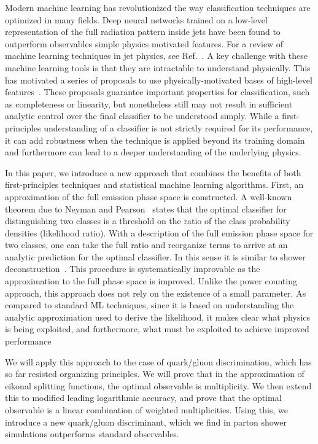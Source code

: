 \documentclass[letterpaper,11pt]{article}
\DeclareRobustCommand{\Ref}[1]{Ref.~\cite{#1}}
\begin{document}
Modern machine learning has revolutionized the way classification techniques are optimized in many fields.
%
Deep neural networks trained on a low-level representation of the full radiation pattern inside jets have been found to outperform observables simple physics motivated features.
%
For a review of machine learning techniques in jet physics, see \Ref{Larkoski:2017jix}.
%
A key challenge with these machine learning tools is that they are intractable to understand physically.
%
This has motivated a series of proposals to use physically-motivated bases of high-level features~\cite{Datta:2017rhs,Datta:2017lxt,Luo:2017ncs,Komiske:2017aww}.
%
These proposals guarantee important properties for classification, such as completeness or linearity, but nonetheless still may not result in sufficient analytic control over the final classifier to be understood simply.
%
While a first-principles understanding of a classifier is not strictly required for its performance, it can add robustness when the technique is applied beyond its training domain and furthermore can lead to a deeper understanding of the underlying physics.

In this paper, we introduce a new approach that combines the benefits of both first-principles techniques and statistical machine learning algorithms.
%
First, an approximation of the full emission phase space is constructed.
%
A well-known theorem due to Neyman and Pearson~\cite{neyman1933ix} states that the optimal classifier for distinguishing two classes is a threshold on the ratio of the class probability densities (likelihood ratio).
%
With a description of the full emission phase space for two classes, one can take the full ratio and reorganize terms to arrive at an analytic prediction for the optimal classifier. In this sense it is similar to shower deconstruction~\cite{Soper:2012pb}.
%
This procedure is systematically improvable as the approximation to the full phase space is improved. Unlike the power counting approach, this approach does not rely on the existence of a small parameter. As compared to standard ML techniques, since it is based on understanding the analytic approximation used to derive the likelihood, it makes clear what physics is being exploited, and furthermore, what must be exploited to achieve improved performance


We will apply this approach to the case of quark/gluon discrimination, which has so far resisted organizing principles. We will prove that in the approximation of eikonal splitting functions, the optimal observable is multiplicity. We then extend this to modified leading logarithmic accuracy, and prove that the optimal observable is a linear combination of weighted multiplicities. Using this, we introduce a new quark/gluon discriminant, which we find in parton shower simulations outperforms standard observables.
\end{document}
